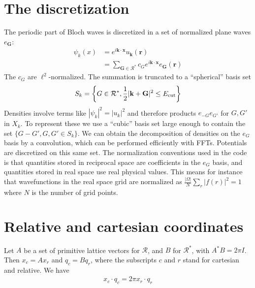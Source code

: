 \documentclass[a4paper]{amsart}
\newcommand{\I}{i}
\renewcommand{\vec}[1]{{\mathbf{#1}}}
\begin{document}
\section{The discretization}
The periodic part of Bloch waves is discretized in a set of normalized
plane waves $e_{\vec G}$:
\begin{align*}
  \psi_{k}(x) &= e^{\I \vec k \cdot \vec x} u_{\vec k}(\vec r)\\
  &= \sum_{\vec G \in \mathcal R^{*}} c_{G}  e^{\I \vec k \cdot \vec x} e_{\vec G}(\vec r)
\end{align*}
The $c_{G}$ are $\ell^{2}$-normalized. The summation is truncated to a
``spherical'' basis set
\begin{align*}
  S_{k} = \left\{G \in \mathcal R^{*}, \frac 1 2 |\vec k+\vec G|^{2} \le E_{\rm cut}\right\}
\end{align*}
Densities involve terms like $|\psi_{k}|^{2} = |u_{k}|^{2}$ and
therefore products $e_{-G} e_{G'}$ for $G, G'$ in $X_{k}$. To
represent these we use a ``cubic'' basis set large enough to contain
the set $\{G-G', G, G' \in S_{k}\}$. We can obtain the decomposition
of densities on the $e_{G}$ basis by a convolution, which can be
performed efficiently with FFTs. Potentials are discretized on this
same set. The normalization conventions used in the code is that
quantities stored in reciprocal space are coefficients in the $e_{G}$
basis, and quantities stored in real space use real physical values.
This means for instance that wavefunctions in the real space grid are
normalized as $\frac{|\Omega|}{N} \sum_{r} |f(r)|^{2} = 1$ where $N$
is the number of grid points.

\section{Relative and cartesian coordinates}
Let $A$ be a set of primitive lattice vectors for $\mathcal R$, and
$B$ for $\mathcal R^{*}$, with $A^{*} B = 2\pi I$. Then $x_{c} = A
x_{r}$ and $q_{c} = B q_{r}$, where the subscripts $c$ and $r$ stand
for cartesian and relative. We have
\begin{align*}
  x_{c} \cdot q_{c} = 2\pi x_{r} \cdot q_{r}
\end{align*}
\end{document}
